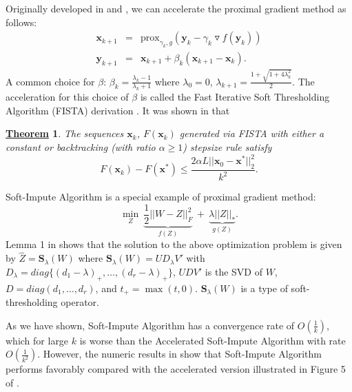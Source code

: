 \documentclass[12pt]{article}
\newcommand{\smc}{\twelvesmc}
\newtheorem{thm}{\underline{\smc Theorem}}
\begin{document}
Originally developed in \cite{nesterov2007gradient} and \cite{beck2009fast}, we can accelerate the proximal gradient method as follows:
\begin{eqnarray*}
\bm{x}_{k+1} &=& \text{prox}_{\gamma_{k}, g}(\bm{y}_{k}-\gamma_{k}\triangledown f(\bm{y}_{k})) \\
\bm{y}_{k+1} &=& \bm{x}_{k+1} +\beta_{k}(\bm{x}_{k+1}-\bm{x}_{k}).
\end{eqnarray*}
A common choice for $\beta$: $\beta_{k} = \frac{\lambda_{k}-1}{\lambda_{k}+1}$ where $\lambda_{0} = 0$, $\lambda_{k+1} = \frac{1+\sqrt{1+4\lambda^{2}_{k}}}{2}.$ The acceleration for this choice of $\beta$ is called the Fast Iterative Soft Thresholding Algorithm (FISTA) derivation \cite{beck2009fast}. It was shown in \cite{beck2009fast} that
\begin{thm}
	The sequences $\bm{x}_{k}$, $F(\bm{x}_{k})$ generated via FISTA with either a constant or backtracking (with ratio $\alpha \geq 1$) stepsize rule satisfy
	\begin{equation*}
	F(\bm{x}_{k}) - F(\bm{x}^{*}) \leq \frac{2\alpha L||\bm{x}_{0}-\bm{x}^{*}||^{2}_{2}}{k^{2}}.
	\end{equation*}
\end{thm}
Soft-Impute Algorithm is a special example of proximal gradient method:
\begin{equation*}
\underset{Z}{\min} ~\underbrace{\frac{1}{2}||W-Z||^{2}_{F}}_{f(Z)} ~+~\underbrace{\lambda||Z||_{*}}_{g(Z)}.
\end{equation*}
Lemma 1 in \cite{mazumder2010spectral} shows that the solution to the above optimization problem is  given by $\widehat{Z} = \bm{S}_{\lambda}(W)$ where  $\bm{S}_{\lambda}(W) = UD_{\lambda}V'$ with $D_{\lambda} = diag\{(d_{1}-\lambda)_{+}, \ldots, (d_{r}-\lambda)_{+}\}$,
$UDV'$ is the SVD of $W$, $D = diag(d_{1}, \ldots, d_{r})$, and $t_{+} = \max(t,0)$.  $\bm{S}_{\lambda}(W)$ is a type of soft-thresholding operator. 

As we have shown, Soft-Impute Algorithm has a convergence rate of $O\left(\frac{1}{k}\right)$, which for large $k$ is worse than the Accelerated Soft-Impute Algorithm with rate $O\left(\frac{1}{k^{2}}\right)$. However, the numeric results in \cite{mazumder2010spectral} show that Soft-Impute Algorithm performs favorably compared with the accelerated version illustrated in Figure 5 of \cite{mazumder2010spectral}.


\vskip 0.2in

\nocite{halko2011finding, hastie2015statistical, bruck1975iterative, mazumder2010spectral, oh2015fast, wong2015matrix, nesterov2007gradient, beck2009fast}

\end{document}
